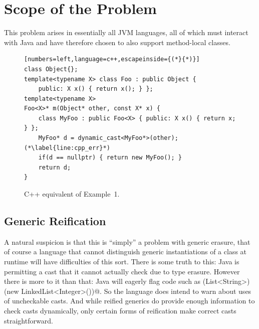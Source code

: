 \section{Scope of the Problem}
This problem arises in essentially all JVM languages, all of which must interact with Java and have therefore chosen to also support method-local classes.

\begin{figure}
\begin{lstlisting}[numbers=left,language=c++,escapeinside={(*}{*)}]
class Object{};
template<typename X> class Foo : public Object {
    public: X x() { return x(); } };
template<typename X>
Foo<X>* m(Object* other, const X* x) {
    class MyFoo : public Foo<X> { public: X x() { return x; } };
    MyFoo* d = dynamic_cast<MyFoo*>(other);(*\label{line:cpp_err}*)
    if(d == nullptr) { return new MyFoo(); }
    return d;
}
\end{lstlisting}
\caption{C++ equivalent of Example~1.}
\label{fig:cpp}
\end{figure}

\subsection{Generic Reification} A natural suspicion is that this is ``simply'' a problem with generic erasure, that of course a language that cannot distinguish generic instantiations of a class at runtime will have difficulties of this sort.
There is some truth to this: Java is permitting a cast that it cannot actually check due to type erasure.
However there is more to it than that: Java will eagerly flag code such as \Q@(List<String>)(new LinkedList<Integer>())@.
So the language does intend to warn about uses of uncheckable casts.
And while reified generics do provide enough information to check casts dynamically, only certain forms of reification
make correct casts straightforward.

